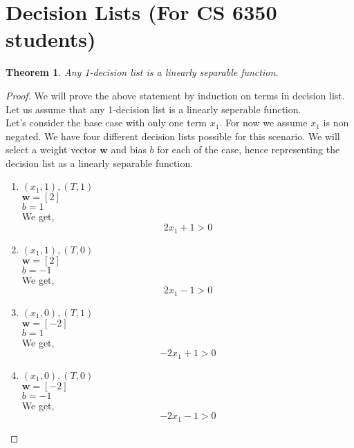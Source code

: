 \newpage
\section{Decision Lists (For CS 6350 students)}
\label{sec:decision-lists}

\newtheorem*{theorem}{Theorem}

\begin{theorem}
Any 1-decision list is a linearly separable function.
\end{theorem}

\begin{proof}
We will prove the above statement by induction on terms in decision list. Let us assume that any 1-decision list is a linearly seperable function.\\
Let's consider the base case with only one term $x_1$. For now we assume $x_1$ is non negated. We have four different decision lists possible for this scenario. We will select a weight vector $\boldsymbol w$ and bias $b$ for each of the case, hence representing the decision list as a linearly separable function.
\begin{enumerate}
\item $(x_1, 1), (T, 1)$\\
$\boldsymbol w = [2]$\\
$b = 1$\\
We get,
$$ 2x_1 + 1 > 0 $$

\item $(x_1, 1), (T, 0)$\\
$\boldsymbol w = [2]$\\
$b = -1$\\
We get,
$$ 2x_1 - 1 > 0 $$

\item $(x_1, 0), (T, 1)$\\
$\boldsymbol w = [-2]$\\
$b = 1$\\
We get,
$$ -2x_1 + 1 > 0 $$

\item $(x_1, 0), (T, 0)$\\
$\boldsymbol w = [-2]$\\
$b = -1$\\
We get,
$$ -2x_1 - 1 > 0 $$
\end{enumerate}


\end{proof}
